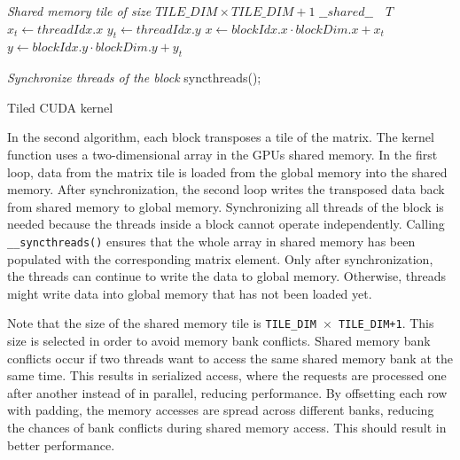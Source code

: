 \documentclass[conference]{IEEEtran}
\begin{document}
    \begin{algorithm}
        \BlankLine
        \emph{Shared memory tile of size $TILE\_DIM \times TILE\_DIM+1$}\;
        $\_\_shared\_\_ \quad T$\;
        $x_t \gets threadIdx.x$\;
        $y_t \gets threadIdx.y$\;
        $x \gets blockIdx.x \cdot blockDim.x + x_t$\;
        $y \gets blockIdx.y \cdot blockDim.y + y_t$\;
        

        \BlankLine
        \emph{Synchronize threads of the block}\;
        syncthreads();

        \BlankLine
        \caption{Tiled CUDA kernel}
        \label{fig:cuda_tiled_implementation}        
    \end{algorithm}
    In the second algorithm, each block transposes a tile of the matrix. The kernel function uses a two-dimensional array in the GPUs shared memory. In the first loop, data from the matrix tile is loaded from the global memory into the shared memory. After synchronization, the second loop writes the transposed data back from shared memory to global memory. Synchronizing all threads of the block is needed because the threads inside a block cannot operate independently. Calling \texttt{\_\_syncthreads()} ensures that the whole array in shared memory has been populated with the corresponding matrix element. Only after synchronization, the threads can continue to write the data to global memory. Otherwise, threads might write data into global memory that has not been loaded yet. 

    Note that the size of the shared memory tile is \texttt{TILE\_DIM $\times$ TILE\_DIM+1}. This size is selected in order to avoid memory bank conflicts. Shared memory bank conflicts occur if two threads want to access the same shared memory bank at the same time. This results in serialized access, where the requests are processed one after another instead of in parallel, reducing performance. By offsetting each row with padding, the memory accesses are spread across different banks, reducing the chances of bank conflicts during shared memory access. This should result in better performance.
\end{document}
